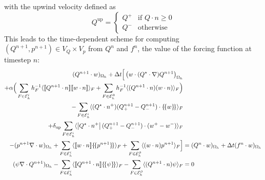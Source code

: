 \documentclass[11pt]{article}
\newcommand{\jump}[1]{[\![ #1]\!]}
\newcommand{\avg}[1]{\{\!\{#1\}\!\}}
\begin{document}
with the upwind velocity defined as
\begin{equation}
    Q^\text{up} = \begin{cases}
        Q^+ & \text{if $Q\cdot n\ge 0$} \\
        Q^- & \text{otherwise}
    \end{cases}
\end{equation}
This leads to the time-dependent scheme for computing $(Q^{n+1},p^{n+1})\in V_Q\times V_p$ from $Q^n$ and $f^n$, the value of the forcing function at timestep $n$:
\begin{subequations}
    \begin{align}
        (Q^{n+1}\cdot w)_{\Omega_h} + \Delta t\Big[  \left(w\cdot (Q^\star\cdot \nabla) Q^{n+1}\right)_{\Omega_h}                                                                                            &
        \notag                                                                                                                                                                                                                                                                     \\ + \alpha \Big(\sum_{F\in\mathcal{E}_h^i} h_F^{-1}\langle \jump{Q^{n+1}\cdot n} \jump{w\cdot n}\rangle_F                                      +  \sum_{F\in\mathcal{E}_h^\partial} h_F^{-1}\langle (Q^{n+1}\cdot n) (w\cdot n)\rangle_F \Big)                                        &  \label{eqn:time_dependent_original_momentum}                                                            \\
        -\sum_{F\in\mathcal{E}_h^i} \langle (Q^\star \cdot n^+)(Q^{n+1}_+ - Q^{n+1}_-)\cdot \avg{w}\rangle_F\notag                                                                                           &                                                                     \\
        +\delta_{\text{up}}\sum_{F\in\mathcal{E}_h^i} \langle \left|Q^\star \cdot n^+\right|(Q^{n+1}_+ - Q^{n+1}_-)\cdot (w^+-w^-)\rangle_F
                                                                                                                                                                                                             & \notag                                                              \\
        - (p^{n+1} \nabla\cdot w)_{\Omega_h} +  \sum_{F\in\mathcal{E}_h^i} \langle \jump{w\cdot n}\avg{p^{n+1}}\rangle_{F}+  \sum_{F\in\mathcal{E}_h^\partial} \langle (w\cdot n)p^{n+1}\rangle_{F}    \Big] & = (Q^n\cdot w)_{\Omega_h} + \Delta t (f^n\cdot w)_{\Omega_h} \notag \\
        (\psi \nabla\cdot Q^{n+1})_{\Omega_h} - \sum_{F\in\mathcal{E}_h^i} \langle \jump{Q^{n+1}\cdot n}\avg{\psi}\rangle_{F} - \sum_{F\in\mathcal{E}_h^\partial} \langle (Q^{n+1}\cdot n)\psi\rangle_{F}    & = 0\label{eqn:time_dependent_original_continuity}
    \end{align}
\end{subequations}
\end{document}
